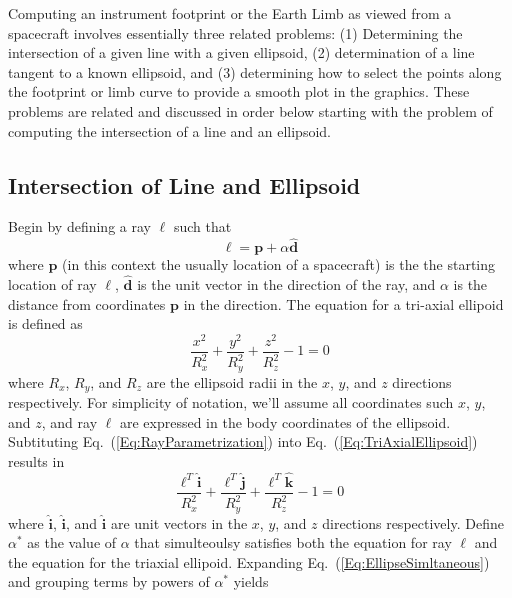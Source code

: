 Computing an instrument footprint or the Earth Limb as viewed from a spacecraft involves essentially three related problems: (1) Determining the intersection of a given line with a given ellipsoid, (2) determination of a line tangent to a known ellipsoid, and (3) determining how to select the points along the footprint or limb curve to provide a smooth plot in the graphics.    These problems are related and discussed in order below starting with the problem of computing the intersection of a line and an ellipsoid.

\subsection{Intersection of Line and Ellipsoid}

Begin by defining a ray $\boldsymbol{\ell}$ such that
%
\begin{equation}
    \boldsymbol{\ell} = \mathbf{p} + \alpha\hat{\mathbf{d}} \label{Eq:RayParametrization}
\end{equation}
%
where $\mathbf{p}$ (in this context the usually location of a spacecraft) is the the starting location of ray $\boldsymbol{\ell}$, $\hat{\mathbf{d}}$ is the unit vector in the direction of the ray, and $\alpha$ is the distance from coordinates $\mathbf{p}$ in the direction.  The equation for a tri-axial ellipoid is defined as
%
\begin{equation}
  \frac{x^2}{R_x^2} + \frac{y^2}{R_y^2} + \frac{z^2}{R_z^2} - 1 = 0 \label{Eq:TriAxialEllipsoid}
\end{equation}
%
where $R_x$, $R_y$, and $R_z$ are the ellipsoid radii in the $x$, $y$, and $z$ directions respectively.
For simplicity of notation, we'll assume all coordinates such $x$, $y$, and $z$, and ray $\boldsymbol\ell$ are 
expressed in the body coordinates of the ellipsoid.
%
Subtituting Eq.~(\ref{Eq:RayParametrization}) into Eq.~(\ref{Eq:TriAxialEllipsoid}) results in
%
\begin{equation}
    \frac{\boldsymbol{\ell}^T \hat{\mathbf{i}}}{R_x^2} + \frac{\boldsymbol{\ell}^T \hat{\mathbf{j}}}{R_y^2} 
    + \frac{\boldsymbol{\ell}^T \hat{\mathbf{k}}}{R_z^2} - 1 = 0 \label{Eq:EllipseSimltaneous}
\end{equation}
%
where $\hat{\mathbf{i}}$, $\hat{\mathbf{i}}$, and $\hat{\mathbf{i}}$ are unit vectors in the $x$, $y$, and $z$ directions respectively.  Define $\alpha^*$ as the value of $\alpha$ that simulteoulsy satisfies both the equation for ray $\boldsymbol{\ell}$ and the equation for the triaxial ellipoid.  Expanding Eq.~(\ref{Eq:EllipseSimltaneous}) and grouping terms by powers of $\alpha^*$ yields
